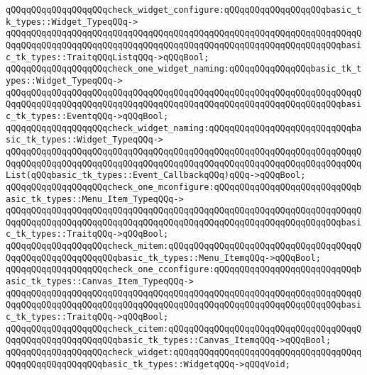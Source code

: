 \verb|qQQqqQQqqQQqqQQqqQQqcheck_widget_configure:qQQqqQQqqQQqqQQqqQQqbasic_tk_types::Widget_TypeqQQq->|\newline
\verb|qQQqqQQqqQQqqQQqqQQqqQQqqQQqqQQqqQQqqQQqqQQqqQQqqQQqqQQqqQQqqQQqqQQqqQQqqQQqqQQqqQQqqQQqqQQqqQQqqQQqqQQqqQQqqQQqqQQqqQQqqQQqqQQqqQQqqQQqbasic_tk_types::TraitqQQqListqQQq->qQQqBool;|\newline
\verb|qQQqqQQqqQQqqQQqqQQqcheck_one_widget_naming:qQQqqQQqqQQqqQQqbasic_tk_types::Widget_TypeqQQq->|\newline
\verb|qQQqqQQqqQQqqQQqqQQqqQQqqQQqqQQqqQQqqQQqqQQqqQQqqQQqqQQqqQQqqQQqqQQqqQQqqQQqqQQqqQQqqQQqqQQqqQQqqQQqqQQqqQQqqQQqqQQqqQQqqQQqqQQqqQQqqQQqbasic_tk_types::EventqQQq->qQQqBool;|\newline
\verb|qQQqqQQqqQQqqQQqqQQqcheck_widget_naming:qQQqqQQqqQQqqQQqqQQqqQQqqQQqbasic_tk_types::Widget_TypeqQQq->|\newline
\verb|qQQqqQQqqQQqqQQqqQQqqQQqqQQqqQQqqQQqqQQqqQQqqQQqqQQqqQQqqQQqqQQqqQQqqQQqqQQqqQQqqQQqqQQqqQQqqQQqqQQqqQQqqQQqqQQqqQQqqQQqqQQqqQQqqQQqqQQqqQQqList(qQQqbasic_tk_types::Event_CallbackqQQq)qQQq->qQQqBool;|\newline
\verb|qQQqqQQqqQQqqQQqqQQqcheck_one_mconfigure:qQQqqQQqqQQqqQQqqQQqqQQqqQQqbasic_tk_types::Menu_Item_TypeqQQq->|\newline
\verb|qQQqqQQqqQQqqQQqqQQqqQQqqQQqqQQqqQQqqQQqqQQqqQQqqQQqqQQqqQQqqQQqqQQqqQQqqQQqqQQqqQQqqQQqqQQqqQQqqQQqqQQqqQQqqQQqqQQqqQQqqQQqqQQqqQQqqQQqbasic_tk_types::TraitqQQq->qQQqBool;|\newline
\verb|qQQqqQQqqQQqqQQqqQQqcheck_mitem:qQQqqQQqqQQqqQQqqQQqqQQqqQQqqQQqqQQqqQQqqQQqqQQqqQQqqQQqqQQqbasic_tk_types::Menu_ItemqQQq->qQQqBool;|\newline
\verb|qQQqqQQqqQQqqQQqqQQqcheck_one_cconfigure:qQQqqQQqqQQqqQQqqQQqqQQqqQQqbasic_tk_types::Canvas_Item_TypeqQQq->|\newline
\verb|qQQqqQQqqQQqqQQqqQQqqQQqqQQqqQQqqQQqqQQqqQQqqQQqqQQqqQQqqQQqqQQqqQQqqQQqqQQqqQQqqQQqqQQqqQQqqQQqqQQqqQQqqQQqqQQqqQQqqQQqqQQqqQQqqQQqqQQqbasic_tk_types::TraitqQQq->qQQqBool;|\newline
\verb|qQQqqQQqqQQqqQQqqQQqcheck_citem:qQQqqQQqqQQqqQQqqQQqqQQqqQQqqQQqqQQqqQQqqQQqqQQqqQQqqQQqqQQqbasic_tk_types::Canvas_ItemqQQq->qQQqBool;|\newline
\verb|qQQqqQQqqQQqqQQqqQQqcheck_widget:qQQqqQQqqQQqqQQqqQQqqQQqqQQqqQQqqQQqqQQqqQQqqQQqqQQqqQQqbasic_tk_types::WidgetqQQq->qQQqVoid;|\newline
\newline
\newline
